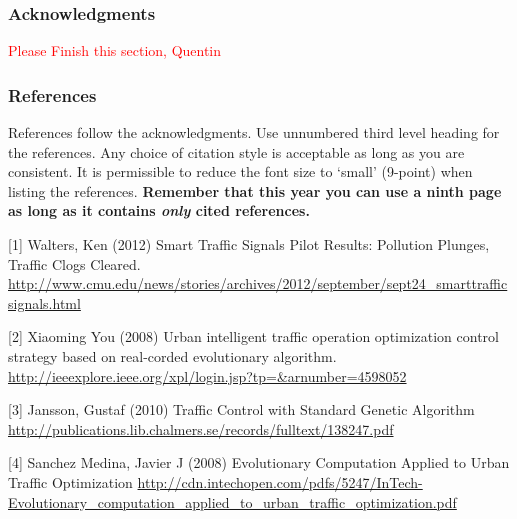 \documentclass{article} %
\begin{document}
\subsubsection*{Acknowledgments}

\textcolor{red}{Please Finish this section, Quentin}

\subsubsection*{References}

References follow the acknowledgments. Use unnumbered third level heading for
the references. Any choice of citation style is acceptable as long as you are
consistent. It is permissible to reduce the font size to `small' (9-point) 
when listing the references. {\bf Remember that this year you can use
a ninth page as long as it contains \emph{only} cited references.}

\small{
[1] Walters, Ken (2012) Smart Traffic Signals Pilot Results: Pollution Plunges, Traffic Clogs Cleared. \url{http://www.cmu.edu/news/stories/archives/2012/september/sept24_smarttrafficsignals.html}

[2] Xiaoming You (2008) Urban intelligent traffic operation optimization control strategy based on real-corded evolutionary algorithm. \url{http://ieeexplore.ieee.org/xpl/login.jsp?tp=&arnumber=4598052}

[3] Jansson, Gustaf (2010) Traffic Control with Standard Genetic Algorithm \url{http://publications.lib.chalmers.se/records/fulltext/138247.pdf}

[4] Sanchez Medina, Javier J (2008) Evolutionary Computation Applied to Urban Traffic Optimization \url{http://cdn.intechopen.com/pdfs/5247/InTech-Evolutionary_computation_applied_to_urban_traffic_optimization.pdf}
}
\end{document}
